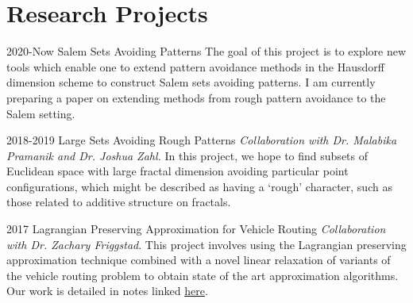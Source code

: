 \documentclass[a4paper]{cv-friggeri}
\begin{document}

\section{Research Projects}

\begin{entrylist}

\entry
{2020-Now}
{Salem Sets Avoiding Patterns}
{}
{The goal of this project is to explore new tools which enable one to extend pattern avoidance methods in the Hausdorff dimension scheme to construct Salem sets avoiding patterns. I am currently preparing a paper on extending methods from rough pattern avoidance to the Salem setting.}


\entry
{2018-2019}
{Large Sets Avoiding Rough Patterns}
{}
{\emph{Collaboration with Dr. Malabika Pramanik and Dr. Joshua Zahl.} In this project, we hope to find subsets of Euclidean space with large fractal dimension avoiding particular point configurations, which might be described as having a `rough' character, such as those related to additive structure on fractals.}


\entry
{2017}
{Lagrangian Preserving Approximation for Vehicle Routing}
{}
{\emph{Collaboration with Dr. Zachary Friggstad}. This project involves using the Lagrangian preserving approximation technique combined with a novel linear relaxation of variants of the vehicle routing problem to obtain state of the art approximation algorithms. Our work is detailed in notes linked \href{https://github.com/jdjake/Notes/raw/master/Research/VehicleRouting/VehicleRouting.pdf}{here}.}





\end{entrylist}
\end{document}
